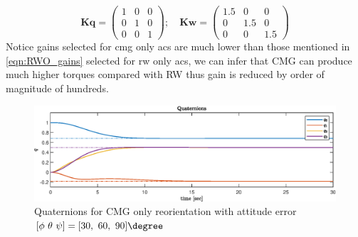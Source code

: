 \begin{equation}
\mathbf{Kq} =\begin{pmatrix}
1 & 0 & 0\\
0 & 1 & 0\\
0 & 0 & 1
\end{pmatrix} ;\quad \mathbf{Kw} =\begin{pmatrix}
1.5 & 0 & 0\\
0 & 1.5 & 0\\
0 & 0 & 1.5
\end{pmatrix}
\label{eqn:CMO_gains}
\end{equation}
Notice gains selected for \acrshort{cmg} only \acrshort{acs} are much lower than those mentioned in \autoref{eqn:RWO_gains} selected for \acrshort{rw}  only \acrshort{acs}, we can infer that CMG can produce much higher torques compared with RW thus gain is reduced by order of magnitude of hundreds.

\begin{figure}[H]
     \centering
    \includegraphics[width=0.9\columnwidth]{figures/plots/CMG/cm_rr_ypr369_q.eps}
    \caption{Quaternions for CMG only reorientation with attitude error $\displaystyle [\phi\ \theta\ \psi] =[30,\ 60,\ 90]\degree $}
    \label{plt:cm_rr_ypr369_q_2}
\end{figure}

